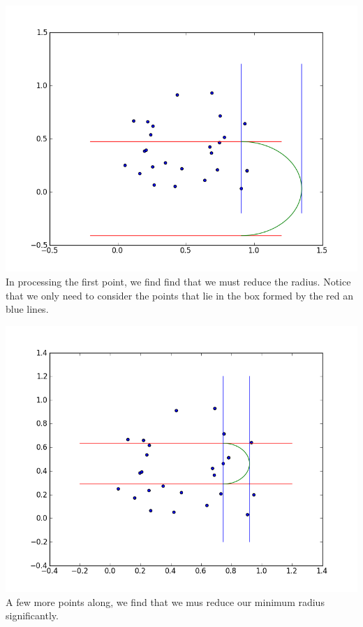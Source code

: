 \includegraphics[width = \textwidth]{ptsweep1.png}
In processing the first point, we find find that we must reduce the radius. Notice that we only need to consider the points that lie in the box formed by the red an blue lines.


\includegraphics[width = \textwidth]{ptsweep4.png}
A few more points along, we find that we mus reduce our minimum radius significantly.

